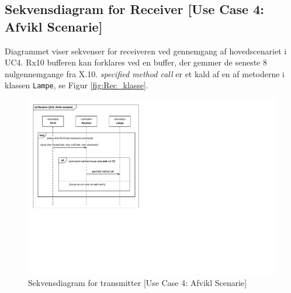 \clearpage

\subsection{Sekvensdiagram for Receiver [Use Case 4: Afvikl Scenarie]}
Diagrammet viser sekvenser for receiveren ved gennemgang af hovedscenariet i UC4. Rx10 bufferen kan forklares ved en buffer, der gemmer de seneste 8 nulgennemgange fra X.10. \emph{specified method call} er et kald af en af metoderne i klassen \texttt{Lampe}, se Figur \ref{fig:Rec_klasse}.

\begin{figure}[h]
	\centering 
	\includegraphics[scale=1,trim=17 225 465 17, clip=true]{Systemarkitektur/Diagrammer/Receiver_UC4_Sekvens.pdf}
	\caption{Sekvensdiagram for transmitter [Use Case 4: Afvikl Scenarie]}
	\label{fig:Rec_UC3Sek}
\end{figure}

\clearpage

